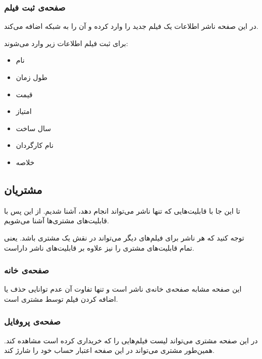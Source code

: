 \documentclass{utap}
\begin{document}
        
         \subsubsection{صفحه‌ی ثبت فیلم}
    در این صفحه ناشر اطلاعات یک فیلم جدید را وارد کرده و آن را به شبکه اضافه می‌کند. 
    
    برای ثبت فیلم اطلاعات زیر وارد می‌شوند:
        \begin{multicols}{3}
        \begin{itemize}[noitemsep,nosep]
            \item نام 
            \item طول زمان  
            \item قیمت 
            \item امتیاز 
            \item سال ساخت
            \item نام کارگردان
            \item خلاصه‌
        \end{itemize}
        \end{multicols}
        
    
    \subsection{مشتریان}
    تا این جا با قابلیت‌هایی که تنها ناشر می‌تواند انجام دهد، آشنا شدیم.
    از این پس با قابلیت‌های مشتری‌ها آشنا می‌شویم.
    
    توجه کنید که هر ناشر برای فیلم‌های دیگر می‌تواند در نقش یک مشتری باشد.
    یعنی تمام قابلیت‌های مشتری را نیز علاوه بر قابلیت‌های ناشر داراست.
    
    
    
        \subsubsection{صفحه‌ی خانه}
    
    این صفحه مشابه صفحه‌ی خانه‌ی ناشر است و تنها تفاوت آن عدم توانایی حذف یا اضافه کردن فیلم توسط مشتری است. 
    
        \subsubsection{صفحه‌ی پروفایل}

        در این صفحه مشتری می‌تواند لیست فیلم‌هایی را که خریداری کرده است مشاهده کند. همین‌طور مشتری می‌تواند در این صفحه اعتبار حساب خود را شارژ کند. 
        
\end{document}
